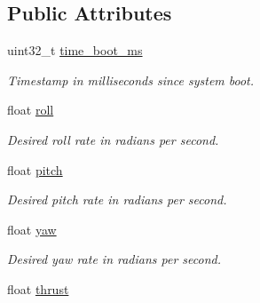 \subsection*{Public Attributes}
\begin{DoxyCompactItemize}
\item 
\hypertarget{struct____mavlink__manual__setpoint__t_aabfde5c1645ed2c5c0e3702cd3b7a63d}{uint32\+\_\+t \hyperlink{struct____mavlink__manual__setpoint__t_aabfde5c1645ed2c5c0e3702cd3b7a63d}{time\+\_\+boot\+\_\+ms}}\label{struct____mavlink__manual__setpoint__t_aabfde5c1645ed2c5c0e3702cd3b7a63d}

\begin{DoxyCompactList}\small\item\em Timestamp in milliseconds since system boot. \end{DoxyCompactList}\item 
\hypertarget{struct____mavlink__manual__setpoint__t_ab0fe1187926dd2bbdfb30c2bdbffbeaf}{float \hyperlink{struct____mavlink__manual__setpoint__t_ab0fe1187926dd2bbdfb30c2bdbffbeaf}{roll}}\label{struct____mavlink__manual__setpoint__t_ab0fe1187926dd2bbdfb30c2bdbffbeaf}

\begin{DoxyCompactList}\small\item\em Desired roll rate in radians per second. \end{DoxyCompactList}\item 
\hypertarget{struct____mavlink__manual__setpoint__t_a17e3f9bb6707394163aafdbf02539694}{float \hyperlink{struct____mavlink__manual__setpoint__t_a17e3f9bb6707394163aafdbf02539694}{pitch}}\label{struct____mavlink__manual__setpoint__t_a17e3f9bb6707394163aafdbf02539694}

\begin{DoxyCompactList}\small\item\em Desired pitch rate in radians per second. \end{DoxyCompactList}\item 
\hypertarget{struct____mavlink__manual__setpoint__t_ab3e21184ffcf6b5451f8227d6ccb35bc}{float \hyperlink{struct____mavlink__manual__setpoint__t_ab3e21184ffcf6b5451f8227d6ccb35bc}{yaw}}\label{struct____mavlink__manual__setpoint__t_ab3e21184ffcf6b5451f8227d6ccb35bc}

\begin{DoxyCompactList}\small\item\em Desired yaw rate in radians per second. \end{DoxyCompactList}\item 
\hypertarget{struct____mavlink__manual__setpoint__t_a2044f740a7e79365a9edf603e5c29d3c}{float \hyperlink{struct____mavlink__manual__setpoint__t_a2044f740a7e79365a9edf603e5c29d3c}{thrust}}\label{struct____mavlink__manual__setpoint__t_a2044f740a7e79365a9edf603e5c29d3c}


\end{DoxyCompactItemize}
